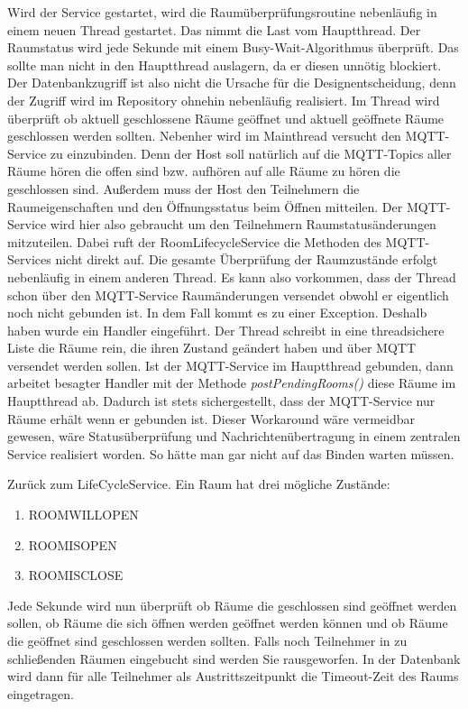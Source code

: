 Wird der Service gestartet, wird die Raumüberprüfungsroutine nebenläufig in einem neuen Thread gestartet. Das nimmt die Last vom Hauptthread.
Der Raumstatus wird jede Sekunde mit einem Busy-Wait-Algorithmus überprüft.
Das sollte man nicht in den Hauptthread auslagern, da er diesen unnötig blockiert. 
Der Datenbankzugriff ist also nicht die Ursache für die Designentscheidung, denn der Zugriff wird im Repository ohnehin nebenläufig realisiert.
Im Thread wird überprüft ob aktuell geschlossene Räume geöffnet und aktuell geöffnete Räume geschlossen werden sollten.
Nebenher wird im Mainthread versucht den MQTT-Service zu einzubinden. 
Denn der Host soll natürlich auf die MQTT-Topics aller Räume hören die offen sind bzw. aufhören auf alle Räume zu hören die geschlossen sind.
Außerdem muss der Host den Teilnehmern die Raumeigenschaften und den Öffnungsstatus beim Öffnen mitteilen. 
Der MQTT-Service wird hier also gebraucht um den Teilnehmern Raumstatusänderungen mitzuteilen.
Dabei ruft der RoomLifecycleService die Methoden des MQTT-Services nicht direkt auf. Die gesamte Überprüfung der Raumzustände erfolgt nebenläufig in einem anderen Thread. 
Es kann also vorkommen, dass der Thread schon über den MQTT-Service Raumänderungen versendet obwohl er eigentlich noch nicht gebunden ist. 
In dem Fall kommt es zu einer Exception.
Deshalb haben wurde ein Handler eingeführt. Der Thread schreibt in eine threadsichere Liste die Räume rein, die ihren Zustand geändert haben und über MQTT versendet werden sollen. 
Ist der MQTT-Service im Hauptthread gebunden, dann arbeitet besagter Handler mit der Methode \textit{postPendingRooms()} diese Räume im Hauptthread ab. 
Dadurch ist stets sichergestellt, dass der MQTT-Service nur Räume erhält wenn er gebunden ist. 
Dieser Workaround wäre vermeidbar gewesen, wäre Statusüberprüfung und Nachrichtenübertragung in einem zentralen Service realisiert worden. So hätte man gar nicht auf das Binden warten müssen.

Zurück zum LifeCycleService. 
Ein Raum hat drei mögliche Zustände:
\begin{enumerate}
\item ROOMWILLOPEN
\item ROOMISOPEN
\item ROOMISCLOSE
\end{enumerate}
 Jede Sekunde wird nun überprüft ob Räume die geschlossen sind geöffnet werden sollen, ob Räume die sich öffnen werden geöffnet werden können und ob Räume die geöffnet sind geschlossen werden sollten. 
Falls noch Teilnehmer in zu schließenden Räumen eingebucht sind werden Sie rausgeworfen. In der Datenbank wird dann für alle Teilnehmer als Austrittszeitpunkt die Timeout-Zeit des Raums eingetragen.



